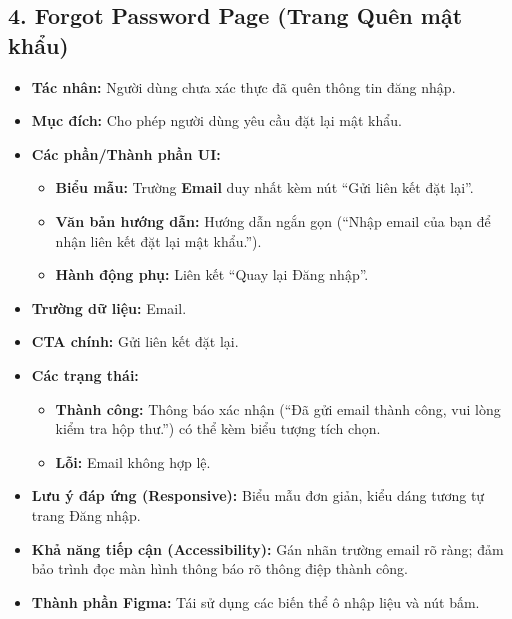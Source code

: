 \documentclass[11pt,a4paper]{article}
\begin{document}
\subsection{4. Forgot Password Page (Trang Quên mật khẩu)}
\begin{itemize}
    \item \textbf{Tác nhân:} Người dùng chưa xác thực đã quên thông tin đăng nhập.
    \item \textbf{Mục đích:} Cho phép người dùng yêu cầu đặt lại mật khẩu.
    \item \textbf{Các phần/Thành phần UI:}
    \begin{itemize}
        \item \textbf{Biểu mẫu:} Trường \textbf{Email} duy nhất kèm nút ``Gửi liên kết đặt lại''.
        \item \textbf{Văn bản hướng dẫn:} Hướng dẫn ngắn gọn (``Nhập email của bạn để nhận liên kết đặt lại mật khẩu.'').
        \item \textbf{Hành động phụ:} Liên kết ``Quay lại Đăng nhập''.
    \end{itemize}
    \item \textbf{Trường dữ liệu:} Email.
    \item \textbf{CTA chính:} Gửi liên kết đặt lại.
    \item \textbf{Các trạng thái:}
    \begin{itemize}
        \item \textbf{Thành công:} Thông báo xác nhận (``Đã gửi email thành công, vui lòng kiểm tra hộp thư.'') có thể kèm biểu tượng tích chọn.
        \item \textbf{Lỗi:} Email không hợp lệ.
    \end{itemize}
    \item \textbf{Lưu ý đáp ứng (Responsive):} Biểu mẫu đơn giản, kiểu dáng tương tự trang Đăng nhập.
    \item \textbf{Khả năng tiếp cận (Accessibility):} Gán nhãn trường email rõ ràng; đảm bảo trình đọc màn hình thông báo rõ thông điệp thành công.
    \item \textbf{Thành phần Figma:} Tái sử dụng các biến thể ô nhập liệu và nút bấm.
\end{itemize}
\end{document}
